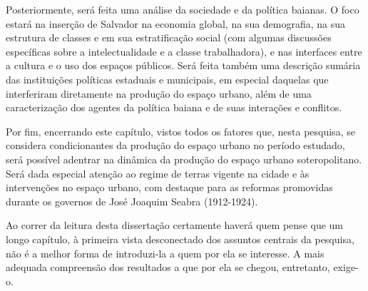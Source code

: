 Posteriormente, será feita uma análise da sociedade e da política baianas. O foco estará na inserção de Salvador na economia global, na sua demografia, na sua estrutura de classes e em sua estratificação social (com algumas discussões específicas sobre a intelectualidade e a classe trabalhadora), e nas interfaces entre a cultura e o uso dos espaços públicos. Será feita também uma descrição sumária das instituições políticas estaduais e municipais, em especial daquelas que interferiram diretamente na produção do espaço urbano, além de uma caracterização dos agentes da política baiana e de suas interações e conflitos. 

Por fim, encerrando este capítulo, vistos todos os fatores que, nesta pesquisa, se considera condicionantes da produção do espaço urbano no período estudado, será possível adentrar na dinâmica da produção do espaço urbano soteropolitano. Será dada especial atenção ao regime de terras vigente na cidade e às intervenções no espaço urbano, com destaque para as reformas promovidas durante os governos de José Joaquim Seabra (1912-1924). 

Ao correr da leitura desta dissertação certamente haverá quem pense que um longo capítulo, à primeira vista desconectado dos assuntos centrais da pesquisa, não é a melhor forma de introduzi-la a quem por ela se interesse. A mais adequada compreensão dos resultados a que por ela se chegou, entretanto, exige-o.

